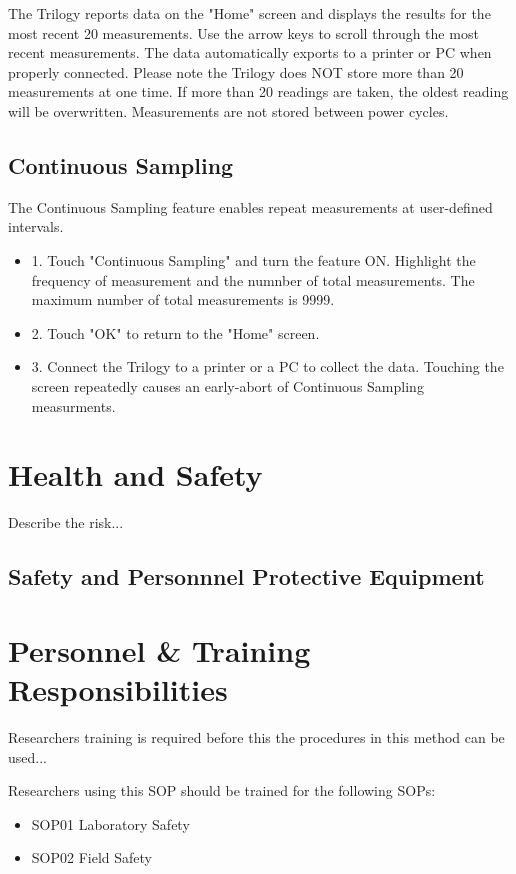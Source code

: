 \documentclass[12pt]{../SOP3_beta}
\begin{document}
\NP The Trilogy reports data on the "Home" screen and displays the results for the most recent 20 measurements. Use the arrow keys to scroll through the most recent measurements. The data automatically exports to a printer or PC when properly connected. Please note the Trilogy does NOT store more than 20 measurements at one time. If more than 20 readings are taken, the oldest reading will be overwritten. Measurements are not stored between power cycles.

\subsection{Continuous Sampling}
\NP The Continuous Sampling feature enables repeat measurements at user-defined intervals.
\begin{itemize}
  \item 1. Touch "Continuous Sampling" and turn the feature ON. Highlight the frequency of measurement and the numnber of total measurements. The maximum number of total measurements is 9999.
  \item 2. Touch "OK" to return to the "Home" screen.
  \item 3. Connect the Trilogy to a printer or a PC to collect the data. Touching the screen repeatedly causes an early-abort of Continuous Sampling measurments. 
\end{itemize}



\section{Health and Safety}

\NP Describe the risk...


\subsection{Safety and Personnnel Protective Equipment}


\section{Personnel \& Training Responsibilities}

\NP Researchers training is required before this the procedures in this method can be used... 

\NP Researchers using this SOP should be trained for the following SOPs:

\begin{itemize}
  \item SOP01 Laboratory Safety
  \item SOP02 Field Safety
\end{itemize}
\end{document}
